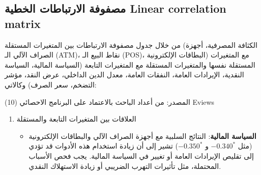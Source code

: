 \documentclass[10pt,a4paper]{report}
\begin{document}
\begin{doublespacing}
\subsection{مصفوفة الارتباطات الخطية \textenglish{Linear correlation matrix}}
من خلال جدول مصفوفة الارتباطات بين المتغيرات المستقلة (الكثافة المصرفية، أجهزة الصراف الآلي الـ (ATM)، نقاط البيع الـ (POS)، البطاقات الإلكترونية) مع المتغيرات المستقلة نفسها والمتغيرات المستقلة مع المتغيرات التابعة (السياسة المالية، السياسة النقدية، الإيرادات العامة، النفقات العامة، معدل الدين الداخلي، عرض النقد، مؤشر التضخم، سعر الصرف) وكالاتي:
\begin{table}[H]
	\captionsetup{font=Large}  %
	\fontsize{12}{12}\selectfont
	\centering
	\caption{مصفوفة الارتباطات بين المتغيرات المعتمدة والمتغيرات المستقلة}
	\label{tab:13.3}
	\end{table}
المصدر: من أعداد الباحث بالاعتماد على البرنامج الاحصائي (10) Eviews
\begin{enumerate}
	\item العلاقات بين المتغيرات التابعة والمستقلة
	
\begin{itemize}
	\item \textbf{السياسة المالية}: 
	النتائج السلبية مع أجهزة الصراف الآلي والبطاقات الإلكترونية (مثل $-0.340^*$ و $-0.350^*$) تشير إلى أن زيادة استخدام هذه الأدوات قد تؤدي إلى تقليص الإيرادات العامة أو تغيير في السياسة المالية. يجب فحص الأسباب المحتملة، مثل تأثيرات التهرب الضريبي أو زيادة الاستهلاك النقدي.
	

\end{itemize}
\end{enumerate}
\end{doublespacing}
\end{document}
